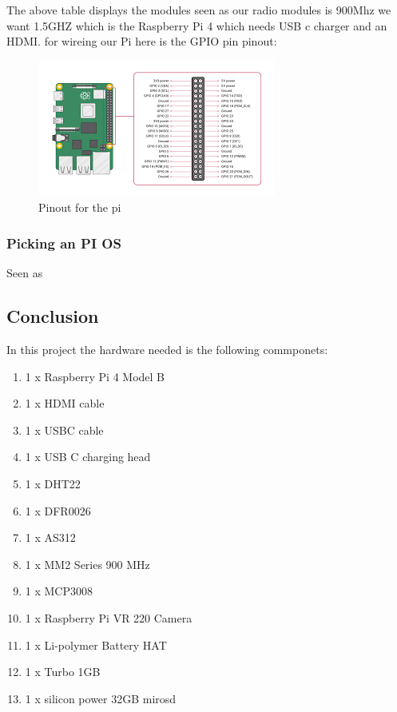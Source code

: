 The above table displays the modules seen as our radio modules is 900Mhz  we want  1.5GHZ which is the Raspberry Pi 4  which needs USB\- c charger and an HDMI.
for wireing our Pi here is  the GPIO pin pinout:
\begin{figure}[h!]
	\centering
	\includegraphics[width=0.8\linewidth]{Images/Pinout_of_pi.png}
	\caption*{Pinout for  the  pi}
	\label{Pinout for  the  pi}
\end{figure}
\subsubsection{Picking an PI OS}
\label{pi os}
Seen as 
\subsection{Conclusion}
In this project the hardware needed is the  following commponets:
\begin{enumerate}
	\item 1 x Raspberry Pi 4 Model B 
	\item 1 x HDMI cable
	\item 1 x USB\-C cable
	\item 1 x USB \-C charging head
	\item 1 x DHT22
	\item 1 x DFR0026
	\item 1 x AS312
	\item 1 x MM2 Series 900 MHz
	\item 1 x MCP3008
	\item 1 x Raspberry Pi VR 220 Camera
	\item  1 x Li-polymer Battery HAT 
	\item 1 x Turbo 1GB
	\item 1 x silicon power 32GB  mirosd
	
	
\end{enumerate}
